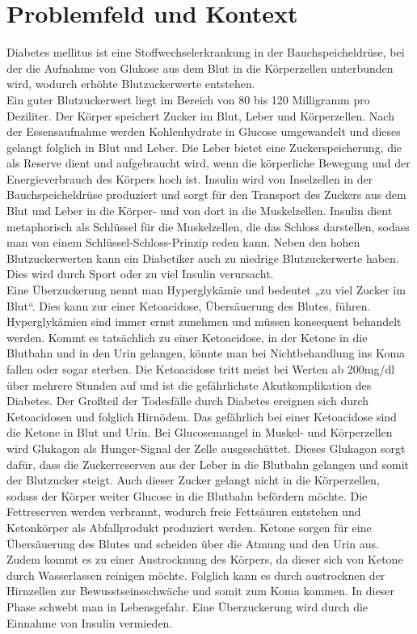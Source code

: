 \documentclass[a4paper, 12pt]{scrartcl}
\begin{document}
			\section{Problemfeld und Kontext}
			Diabetes mellitus ist eine Stoffwechselerkrankung in der Bauchspeicheldrüse, bei der die Aufnahme von Glukose aus dem Blut in die Körperzellen unterbunden wird, wodurch erhöhte Blutzuckerwerte entstehen. \\
			Ein guter Blutzuckerwert liegt im Bereich von 80 bis 120 Milligramm pro Deziliter. Der Körper speichert Zucker im Blut, Leber und Körperzellen. Nach der Essensaufnahme werden Kohlenhydrate in Glucose umgewandelt und dieses gelangt folglich in Blut und Leber. Die Leber bietet eine Zuckerspeicherung, die als Reserve dient und aufgebraucht wird, wenn die körperliche Bewegung und der Energieverbrauch des Körpers hoch ist. Insulin wird von Inselzellen in der Bauchspeicheldrüse produziert und sorgt für den Transport des Zuckers aus dem Blut und Leber in die Körper- und von dort in die Muskelzellen. Insulin dient metaphorisch als Schlüssel für die Muskelzellen, die das Schloss darstellen, sodass man von einem Schlüssel-Schloss-Prinzip reden kann. Neben den hohen Blutzuckerwerten kann ein Diabetiker auch zu niedrige Blutzuckerwerte haben. Dies wird durch Sport oder zu viel Insulin verursacht.\\
			Eine Überzuckerung nennt man Hyperglykämie und bedeutet „zu viel Zucker im Blut“. Dies kann zur einer Ketoacidose, Übersäuerung des Blutes, führen. Hyperglykämien sind immer ernst zunehmen und müssen konsequent behandelt werden. Kommt es tatsächlich zu einer Ketoacidose, in der Ketone in die Blutbahn und in den Urin gelangen, könnte man bei Nichtbehandlung ins Koma fallen oder sogar sterben. 
			Die Ketoacidose tritt meist bei Werten ab 200mg/dl über mehrere Stunden auf und ist die gefährlichste Akutkomplikation des Diabetes. Der Großteil der Todesfälle durch Diabetes ereignen sich durch Ketoacidosen und folglich Hirnödem. 
			Das gefährlich bei einer Ketoacidose sind die Ketone in Blut und Urin. Bei Glucosemangel in Muskel- und Körperzellen wird Glukagon als Hunger-Signal der Zelle ausgeschüttet. Dieses Glukagon sorgt dafür, dass die Zuckerreserven aus der Leber in die Blutbahn gelangen und somit der Blutzucker steigt. Auch dieser Zucker gelangt nicht in die Körperzellen, sodass der Körper weiter Glucose in die Blutbahn befördern möchte. Die Fettreserven werden verbrannt, wodurch freie Fettsäuren entstehen und Ketonkörper als Abfallprodukt produziert werden. Ketone sorgen für eine Übersäuerung des Blutes und scheiden über die Atmung und den Urin aus. Zudem kommt es zu einer Austrocknung des Körpers, da dieser sich von Ketone durch Wasserlassen reinigen möchte. Folglich kann es durch austrocknen der Hirnzellen zur Bewusstseinsschwäche und somit zum Koma kommen. In dieser Phase schwebt man in Lebensgefahr. Eine Überzuckerung wird durch die Einnahme von Insulin vermieden.\\
\end{document}
